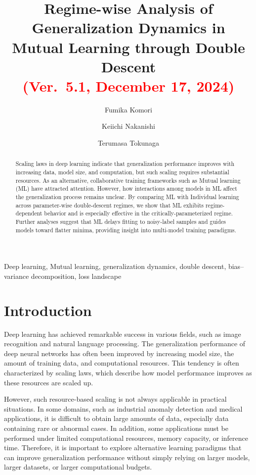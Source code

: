 \documentclass[dvipdfmx]{nolta}
\title{Regime-wise Analysis of Generalization Dynamics in Mutual Learning through Double Descent\\
\textcolor{red}{(Ver.\ 5.1, December 17, 2024)}}
\author{Fumika Komori}{1}\orcid{0009-0002-0232-8790},
\author*{Keiichi Nakanishi}{1}\orcid{0009-0005-7638-2679},
\author{Terumasa Tokunaga}{2,3}\orcid{0000-0003-1091-2022}
\begin{document}
\begin{abstract}
Scaling laws in deep learning indicate that generalization performance improves with increasing data, model size, and computation, but such scaling requires substantial resources. As an alternative, collaborative training frameworks such as Mutual learning (ML) have attracted attention. However, how interactions among models in ML affect the generalization process remains unclear. By comparing ML with Individual learning across parameter-wise double-descent regimes, we show that ML exhibits regime-dependent behavior and is especially effective in the critically-parameterized regime. Further analyses suggest that ML delays fitting to noisy-label samples and guides models toward flatter minima, providing insight into multi-model training paradigms.
\end{abstract}

\begin{keywords}
Deep learning, Mutual learning, generalization dynamics, double descent, bias--variance decomposition, loss landscape
\end{keywords}

\maketitle

\section{Introduction}
Deep learning has achieved remarkable success in various fields, such as image recognition and natural language processing. The generalization performance of deep neural networks has often been improved by increasing model size, the amount of training data, and computational resources\cite{kaplan_scaling_2020}. This tendency is often characterized by scaling laws, which describe how model performance improves as these resources are scaled up.

However, such resource-based scaling is not always applicable in practical situations. In some domains, such as industrial anomaly detection and medical applications, it is difficult to obtain large amounts of data, especially data containing rare or abnormal cases. In addition, some applications must be performed under limited computational resources, memory capacity, or inference time. Therefore, it is important to explore alternative learning paradigms that can improve generalization performance without simply relying on larger models, larger datasets, or larger computational budgets.
\end{document}
